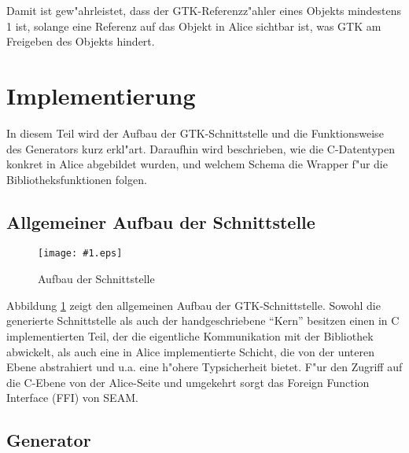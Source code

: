 \documentclass[a4paper,titlepage]{article}
\newcommand{\showimage}[1]{\begin{center}\texttt{[image: \#1.eps]}\end{center}}
\begin{document}
Damit ist gew"ahrleistet, dass der GTK-Referenz\-z"ahler eines Objekts
mindestens 1 ist, solange eine Referenz auf das Objekt in Alice sichtbar ist, 
was GTK am Freigeben des Objekts hindert.


\section{Implementierung}
\label{Implementierung}

In diesem Teil wird der Aufbau der GTK-Schnittstelle und die Funktionsweise
des Generators kurz erkl"art. Daraufhin wird beschrieben, wie die C-Datentypen
konkret in Alice abgebildet wurden, und welchem Schema die Wrapper f"ur die
Bibliotheksfunktionen folgen. 

\subsection{Allgemeiner Aufbau der Schnittstelle}

\begin{figure}
\showimage{layout}
\caption{Aufbau der Schnittstelle}
\label{Layout}
\end{figure}
Abbildung \ref{Layout} zeigt den allgemeinen Aufbau der GTK-Schnittstelle.
Sowohl die generierte Schnittstelle als auch der handgeschriebene ``Kern''
besitzen einen in C implementierten Teil, der die eigentliche Kommunikation
mit der Bibliothek abwickelt, als auch eine in Alice implementierte
Schicht, die von der unteren Ebene abstrahiert und u.a. eine h"ohere
Typsicherheit bietet. F"ur den Zugriff auf die C-Ebene von der Alice-Seite
und umgekehrt sorgt das Foreign Function Interface (FFI) von SEAM.

\subsection{Generator}
\end{document}
